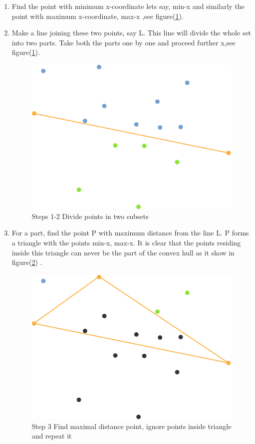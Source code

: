 \begin{enumerate}
    \item Find the point with minimum x-coordinate lets say, min-x and similarly the
    point with maximum x-coordinate, max-x ,see figure(\ref{fig:figure3.2}).
    \item Make a line joining these two points, say L. This line will divide the whole set
    into two parts. Take both the parts one by one and proceed further x,see figure(\ref{fig:figure3.2}).

    \begin{figure}[ht]
        \centering
        \includegraphics[width=12cm]{chapiter3/figures/figure 02 Steps 1-2 Divide points in two subsets.png}
        \setlength{\fboxrule}{2pt}
        \caption{Steps 1-2 Divide points in two subsets}
        \label{fig:figure3.2}
    \end{figure}
    \vspace{2cm}
    \item For a part, find the point P with maximum distance from the line L. P forms a
    triangle with the points min-x, max-x. It is clear that the points residing inside
    this triangle can never be the part of the convex hull as it show in figure(\ref{fig:figure3.3}) .
    \begin{figure}[ht!]
        \centering
        \includegraphics[width=12cm]{chapiter3/figures/FIG3.png}
        \setlength{\fboxrule}{2pt}
        \caption{Step 3 Find maximal distance point, ignore points inside triangle and repeat it}
        \label{fig:figure3.3}
    \end{figure}


\end{enumerate}
